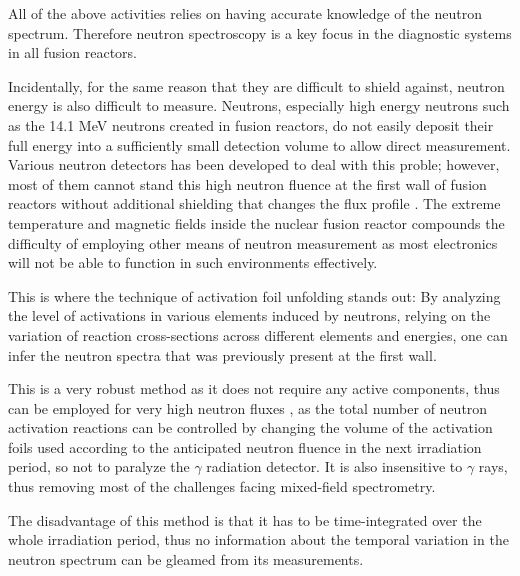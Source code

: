 \documentclass[a4paper, 12pt]{article}
\begin{document}
All of the above activities relies on having accurate knowledge of the neutron spectrum. Therefore neutron spectroscopy is a key focus in the diagnostic systems in all fusion reactors.

Incidentally, for the same reason that they are difficult to shield against, neutron energy is also difficult to measure. Neutrons, especially high energy neutrons such as the 14.1 MeV neutrons created in fusion reactors, do not easily deposit their full energy into a sufficiently small detection volume to allow direct measurement\cite{Knoll2010}. Various neutron detectors has been developed to deal with this proble;%
however, most of them cannot stand this high neutron fluence at the first wall of fusion reactors without additional shielding that changes the flux profile \cite{ScintillationDetectorResponseFunction}.
The extreme temperature and magnetic fields inside the nuclear fusion reactor compounds the difficulty of employing other means of neutron measurement as most electronics will not be able to function in such environments effectively. \cite{CCDCameraDamage}

This is where the technique of activation foil unfolding stands out: By analyzing the level of activations in various elements induced by neutrons, relying on the variation of reaction cross-sections across different elements and energies, one can infer the neutron spectra that was previously present at the first wall.

This is a very robust method as it does not require any active components, thus can be employed for very high neutron fluxes \cite{NSpecHistoricalReviewAndPresentStatus}, as the total number of neutron activation reactions can be controlled by changing the volume of the activation foils used \cite{bethColling_TBMD} according to the anticipated neutron fluence in the next irradiation period, so not to paralyze the $\gamma$ radiation detector. It is also insensitive to $\gamma$ rays, thus removing most of the challenges facing mixed-field spectrometry. \cite{NeutronSpectrometryInMixedFieldsMultiSphereSpectrometers}

The disadvantage of this method is that it has to be time-integrated over the whole irradiation period, thus no information about the temporal variation in the neutron spectrum can be gleamed from its measurements.
\end{document}
